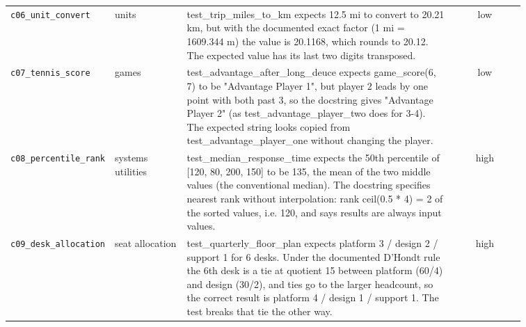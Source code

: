 \begin{small}
\begin{longtable}{p{0.20\linewidth}p{0.14\linewidth}p{0.52\linewidth}c}
\texttt{c06\_unit\_convert} & units & test\_trip\_miles\_to\_km expects 12.5 mi to convert to 20.21 km, but with the documented exact factor (1 mi = 1609.344 m) the value is 20.1168, which rounds to 20.12. The expected value has its last two digits transposed. & low \\
\texttt{c07\_tennis\_score} & games & test\_advantage\_after\_long\_deuce expects game\_score(6, 7) to be "Advantage Player 1", but player 2 leads by one point with both past 3, so the docstring gives "Advantage Player 2" (as test\_advantage\_player\_two does for 3-4). The expected string looks copied from test\_advantage\_player\_one without changing the player. & low \\
\texttt{c08\_percentile\_rank} & systems utilities & test\_median\_response\_time expects the 50th percentile of [120, 80, 200, 150] to be 135, the mean of the two middle values (the conventional median). The docstring specifies nearest rank without interpolation: rank ceil(0.5 * 4) = 2 of the sorted values, i.e. 120, and says results are always input values. & high \\
\texttt{c09\_desk\_allocation} & seat allocation & test\_quarterly\_floor\_plan expects platform 3 / design 2 / support 1 for 6 desks. Under the documented D'Hondt rule the 6th desk is a tie at quotient 15 between platform (60/4) and design (30/2), and ties go to the larger headcount, so the correct result is platform 4 / design 1 / support 1. The test breaks that tie the other way. & high \\
\bottomrule
\end{longtable}
\end{small}